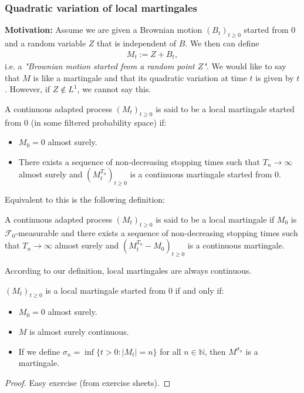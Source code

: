 \documentclass[../mainfile.tex]{subfiles}
\begin{document}
\subsubsection{Quadratic variation of local martingales}
\textbf{Motivation:} Assume we are given a Brownian motion $(B_t)_{t \geq 0}$ started from $0$ and a random variable $Z$ that is independent of $B$. We then can define 
\begin{align*}
M_t:= Z + B_t,
\end{align*}
i.e. a \textit{"Brownian motion started from a random point $Z$"}. We would like to say that $M$ is like a martingale and that its quadratic variation at time $t$ is given by $t$. However, if $Z \notin L^1$, we cannot say this. 
\begin{defn} A continuous adapted process $(M_t)_{t \geq 0}$ is said to be a local martingale started from $0$ (in some filtered probability space) if: 
\begin{itemize}
\item $M_0=0$ almost surely.
\item There exists a sequence of non-decreasing stopping times such that $T_n \to \infty$ almost surely and $(M_t^{T_n})_{t \geq 0}$ is a continuous martingale started from $0$. 
\end{itemize}
\end{defn}
Equivalent to this is the following definition:
\begin{defn} A continuous adapted process $(M_t)_{t \geq 0}$ is said to be a local martingale if $M_0$ is $\mathcal{F}_0$-measurable and there exists a sequence of non-decreasing stopping times such that $T_n \to \infty$ almost surely and $(M_t^{T_n}-M_0)_{t \geq 0}$ is a continuous martingale. 
\end{defn}
\newpage
\begin{rem} According to our definition, local martingales are always continuous. 
\end{rem}
\begin{lem} $(M_t)_{t \geq 0}$ is a local martingale started from $0$ if and only if:
\begin{itemize}
\item $M_0=0$ almost surely.
\item $M$ is almost surely continuous.
\item If we define $\sigma_n = \inf \{ t > 0 : |M_t|=n \}$ for all $n \in \mathbb{N}$, then $M^{\sigma_n}$ is a martingale. 
\end{itemize}
\end{lem}
\begin{proof}
Easy exercise (from exercise sheets). 
\end{proof}
\end{document}

